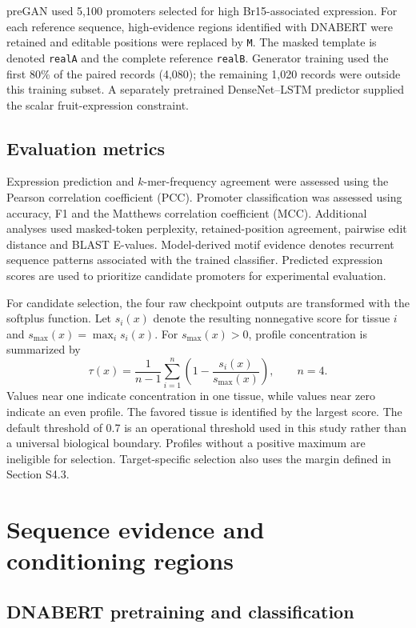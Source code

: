 \documentclass[10pt]{article}
\begin{document}
preGAN used 5,100 promoters selected for high Br15-associated expression. For each reference sequence, high-evidence regions identified with DNABERT were retained and editable positions were replaced by \texttt{M}. The masked template is denoted \texttt{realA} and the complete reference \texttt{realB}. Generator training used the first 80\% of the paired records (4,080); the remaining 1,020 records were outside this training subset. A separately pretrained DenseNet--LSTM predictor supplied the scalar fruit-expression constraint.

\subsection{Evaluation metrics}

Expression prediction and $k$-mer-frequency agreement were assessed using the Pearson correlation coefficient (PCC). Promoter classification was assessed using accuracy, F1 and the Matthews correlation coefficient (MCC). Additional analyses used masked-token perplexity, retained-position agreement, pairwise edit distance and BLAST E-values. Model-derived motif evidence denotes recurrent sequence patterns associated with the trained classifier. Predicted expression scores are used to prioritize candidate promoters for experimental evaluation.

For candidate selection, the four raw checkpoint outputs are transformed with the softplus function. Let $s_i(x)$ denote the resulting nonnegative score for tissue $i$ and $s_{\max}(x)=\max_i s_i(x)$. For $s_{\max}(x)>0$, profile concentration is summarized by
\[
\tau(x)=\frac{1}{n-1}\sum_{i=1}^{n}
\left(1-\frac{s_i(x)}{s_{\max}(x)}\right),\qquad n=4.
\]
Values near one indicate concentration in one tissue, while values near zero indicate an even profile. The favored tissue is identified by the largest score. The default threshold of 0.7 is an operational threshold used in this study rather than a universal biological boundary. Profiles without a positive maximum are ineligible for selection. Target-specific selection also uses the margin defined in Section S4.3.

\section{Sequence evidence and conditioning regions}

\subsection{DNABERT pretraining and classification}
\end{document}
